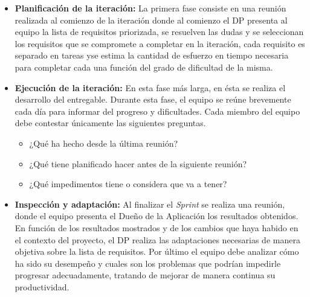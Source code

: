 \begin{itemize}
\item \textbf{Planificación de la iteración:} La primera fase consiste en una reunión realizada al comienzo de la iteración donde al comienzo el DP presenta al equipo la lista de requisitos priorizada, se resuelven las dudas y se seleccionan los requisitos que se compromete a completar en la iteración, cada requisito es separado en tareas  yse estima la cantidad de esfuerzo en tiempo necesaria para completar cada una función del grado de dificultad de la misma.

\item \textbf{Ejecución de la iteración:} En esta fase más larga, en ésta se realiza el desarrollo del entregable. Durante esta fase, el equipo se reúne brevemente cada día para informar del progreso y dificultades. Cada miembro del equipo debe contestar únicamente las siguientes preguntas.
\begin{itemize}
\item ¿Qué ha hecho desde la última reunión?
\item ¿Qué tiene planificado hacer antes de la siguiente reunión?
\item ¿Qué impedimentos tiene o considera que va a tener?
\end{itemize}

\item \textbf{Inspección y adaptación:} Al finalizar el \textit{Sprint} se realiza una reunión, donde el equipo presenta el Dueño de la Aplicación los resultados obtenidos. En función de los resultados mostrados y de los cambios que haya habido en el contexto del proyecto, el DP realiza las adaptaciones necesarias de manera objetiva sobre la lista de requisitos. Por último el equipo debe analizar cómo ha sido su desempeño y cuales son los problemas que podrían impedirle progresar adecuadamente, tratando de mejorar de manera continua su productividad.

\end{itemize}








 
